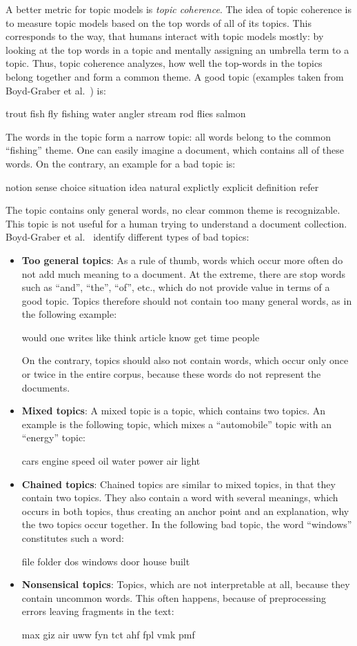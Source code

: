 \documentclass[
        a4paper,
        titlepage,
        twoside,
        parskip,
        numbers=noenddot
        ]{scrbook}
\newcommand{\topicbox}[1]{
  \setlength{\OuterFrameSep}{0pt}
  \begin{framed}
    #1
  \end{framed}
}
\newcommand{\topicboxList}[1]{
  \setlength{\OuterFrameSep}{0pt}
  \newline
  \begin{minipage}{\linewidth}
    \vspace{6pt}
    \begin{framed}
      #1
    \end{framed}
    \vspace{6pt}
  \end{minipage}
}
\theoremstyle{break}
\begin{document}
A better metric for topic models is \emph{topic coherence}.
The idea of topic coherence is to measure topic models based on the top words of all of its topics.
This corresponds to the way, that humans interact with topic models mostly: by looking at the top words in a topic and mentally assigning an umbrella term to a topic.
Thus, topic coherence analyzes, how well the top-words in the topics belong together and form a common theme.
A good topic (examples taken from Boyd-Graber et al.~\cite{Boyd-graber2014}) is:
\topicbox{trout fish fly fishing water angler stream rod flies salmon}
The words in the topic form a narrow topic: all words belong to the common ``fishing'' theme.
One can easily imagine a document, which contains all of these words.
On the contrary, an example for a bad topic is:
\topicbox{notion sense choice situation idea natural explictly explicit definition refer}
The topic contains only general words, no clear common theme is recognizable.
This topic is not useful for a human trying to understand a document collection.
Boyd-Graber et al.~\cite{Boyd-graber2014} identify different types of bad topics:
\begin{itemize}
  \item
    \textbf{Too general topics}: As a rule of thumb, words which occur more often do not add much meaning to a document.
    At the extreme, there are stop words such as ``and'', ``the'', ``of'', etc., which do not provide value in terms of a good topic.
    Topics therefore should not contain too many general words, as in the following example:
    \topicboxList{would one writes like think article know get time people}
    On the contrary, topics should also not contain words, which occur only once or twice in the entire corpus, because these words do not represent the documents.
  \item
    \textbf{Mixed topics}: A mixed topic is a topic, which contains two topics.
    An example is the following topic, which mixes a ``automobile'' topic with an ``energy'' topic:
    \topicboxList{cars engine speed oil water power air light}
  \item
    \textbf{Chained topics}: Chained topics are similar to mixed topics, in that they contain two topics.
    They also contain a word with several meanings, which occurs in both topics, thus creating an anchor point and an explanation, why the two topics occur together.
    In the following bad topic, the word ``windows'' constitutes such a word:
    \topicboxList{file folder dos windows door house built}
  \item
    \textbf{Nonsensical topics}:
    Topics, which are not interpretable at all, because they contain uncommon words.
    This often happens, because of preprocessing errors leaving fragments in the text:
    \topicboxList{max giz air uww fyn tct ahf fpl vmk pmf}
\end{itemize}
\end{document}
